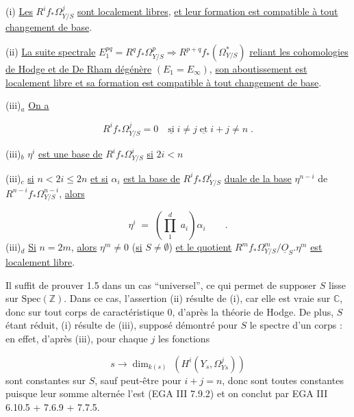 (i) \underline{Les} $R^i f_* \Omega^j_{Y/S}$ \underline{sont localement libres}, \underline{et leur formation est compatible à tout changement de base}.

(ii) \underline{La suite spectrale} $E_1^{pq} = R^q f_* \Omega^p_{Y/S} \Longrightarrow R^{p+q} f_*(\Omega^*_{Y/S})$ \underline{reliant les cohomologies de Hodge et de De Rham dégénère} $(E_1 = E_\infty)$, \underline{son aboutissement est localement libre et sa formation est compatible à tout changement de base}.

(iii)$_a$ \underline{On a}

\begin{equation*}
R^i f_* \Omega^j_{Y/S} = 0 \quad \underline{\mbox{si}} \; i \neq j \; \underline{\mbox{et}} \; i+j \neq n \; .
\end{equation*}


(iii)$_b$ $\eta^i$ \underline{est une base de} $R^i f_* \Omega^i_{Y/S}$ \underline{si} $2i < n$

(iii)$_c$ \underline{si} $n<2i\leq 2n$ \underline{et si} $\alpha_i$ \underline{est la base de} $R^i f_* \Omega^i_{Y/S}$ \underline{duale de la base} $\eta^{n-i}$ de $R^{n-i} f_* \Omega^{n-i}_{Y/S}$, \underline{alors}

\begin{equation*}
\eta^i \;=\; \left( \prod_1^d \; a_i \right) \alpha_i \qquad .
\end{equation*}
(iii)$_d$ \underline{Si} $n = 2m$, \underline{alors} $\eta^m \neq 0$ (\underline{si} $S \neq \emptyset$) \underline{et le quotient} $R^m f_* \Omega^m_{Y/S}/\underline{O}_S . \eta^m$ \underline{est localement libre}.

Il suffit de prouver 1.5 dans un cas ``universel'', ce qui permet de supposer $S$ lisse sur $\mathrm{Spec}(\mathbb{Z})$. Dans ce cas, l'assertion (ii) résulte de (i), car elle est vraie sur $\mathbb{C}$, donc sur tout corps de caractéristique $0$, d'après la théorie de Hodge. De plus, $S$ étant réduit, (i) résulte de (iii), supposé démontré pour $S$ le spectre d'un corps : en effet, d'après (iii), pour chaque $j$ les fonctions

\begin{equation*}
s \longrightarrow \dim_{k(s)} \; (H^i(Y_s,\Omega^j_{Ys}))
\end{equation*}
sont constantes sur $S$, sauf peut-être pour $i + j = n$, donc sont toutes constantes puisque leur somme alternée l'est (EGA III 7.9.2) et on conclut par EGA III 6.10.5 + 7.6.9 + 7.7.5.

